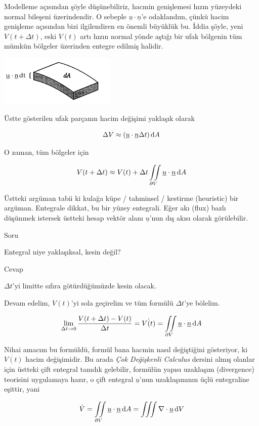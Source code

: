 \documentclass[12pt,fleqn]{article}\usepackage{../../common}
\begin{document}
Modelleme açısından şöyle düşünebiliriz, hacmin genişlemesi hızın yüzeydeki
normal bileşeni üzerindendir. O sebeple $\underline{u} \cdot \underline{n}$'e
odaklandım, çünkü hacim genişleme açısından bizi ilgilendiren en önemli
büyüklük bu. İddia şöyle, yeni $V(t + \Delta t)$, eski $V(t)$ artı hızın
normal yönde aştığı bir ufak bölgenin tüm mümkün bölgeler üzerinden entegre
edilmiş halidir.

\includegraphics[width=15em]{16_04.png}

Üstte gösterilen ufak parçanın hacim değişimi yaklaşık olarak

$$ 
\Delta V \approx (\underline{u} \cdot \underline{n} \Delta t) \,\mathrm{d} A
$$

O zaman, tüm bölgeler için

$$ 
V(t + \Delta t) \approx V(t) + 
\Delta t \iint\limits_{\partial V} \underline{u} \cdot \underline{n} \,\mathrm{d} A
$$

Üstteki argüman tabii ki kulağa küpe / tahminsel / kestirme (heuristic) bir
argüman. Entegrale dikkat, bu bir yüzey entegrali. Eğer akı (flux) bazlı
düşünmek istersek üstteki hesap vektör alanı $\underline{u}$'nun dış akısı
olarak görülebilir.

Soru

Entegral niye yaklaşıksal, kesin değil? 

Cevap

$\Delta t$'yi limitte sıfıra götürdüğümüzde kesin olacak. 

Devam edelim, $V(t)$'yi sola geçirelim ve tüm formülü $\Delta t$'ye
bölelim.

$$ 
\lim_{\Delta t \to 0} \frac{ V(t + \Delta t) - V(t)}{\Delta t} = \dot{V(t)} =
\iint\limits_{\partial V} \underline{u} \cdot \underline{n} \,\mathrm{d} A
$$

Nihai amacım bu formüldü, formül bana hacmin nasıl değiştiğini gösteriyor,
ki $\dot{V(t)}$ hacim değişimidir. Bu arada {\em Çok Değişkenli Calculus}
dersini almış olanlar için üstteki çift entegral tanıdık gelebilir,
formülün yapısı uzaklaşım (divergence) teorisini uygulamaya hazır, o çift
entegral $\underline{u}$'nun uzaklaşımının üçlü entegraline eşittir, yani

$$ 
\dot{V} = 
\iint\limits_{\partial V}  \underline{u} \cdot \underline{n} \,\mathrm{d} A = 
\iiint \nabla \cdot \underline{u} \,\mathrm{d} V
$$
\end{document}

